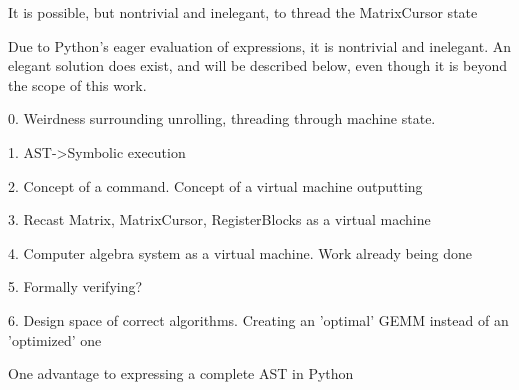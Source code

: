 It is possible, but nontrivial and inelegant, to thread the MatrixCursor state 

Due to Python's eager evaluation of expressions, it is nontrivial and inelegant. An elegant solution does exist, and will be described below, even though it is beyond the scope of this work.


0. Weirdness surrounding unrolling, threading through machine state. 

1. AST->Symbolic execution

2. Concept of a command. Concept of a virtual machine outputting 

3. Recast Matrix, MatrixCursor, RegisterBlocks as a virtual machine

4. Computer algebra system as a virtual machine. Work already being done 

5. Formally verifying?

6. Design space of correct algorithms. Creating an 'optimal' GEMM instead of an 'optimized' one






One advantage to expressing a complete AST in Python

